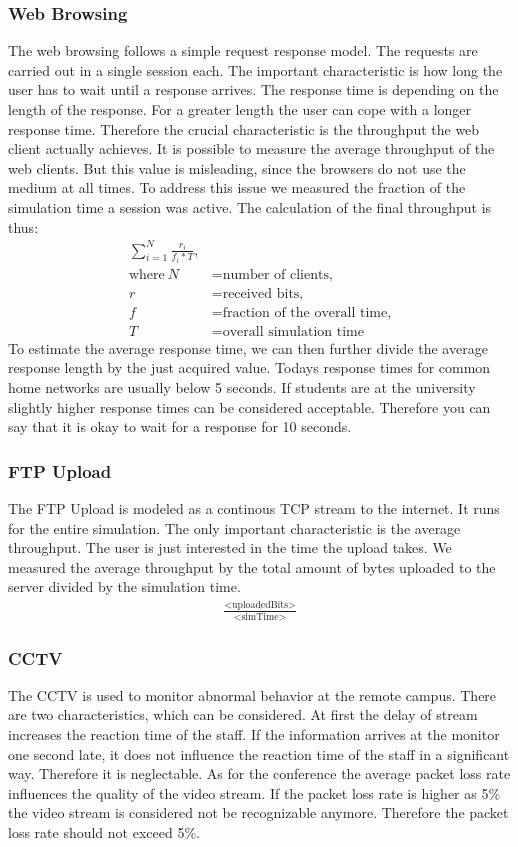 \documentclass[
10pt, %
a4paper, %
oneside, %
headinclude,footinclude, %
BCOR5mm, %
]{scrartcl}
\begin{document}
\subsubsection{Web Browsing}
The web browsing follows a simple request response model. The requests are carried out in a single session each. The important characteristic is how long the user has to wait until a response arrives. The response time is depending on the length of the response. For a greater length the user can cope with a longer response time. Therefore the crucial characteristic is the throughput the web client actually achieves. 
It is possible to measure the average throughput of the web clients. But this value is misleading, since the browsers do not use the medium at all times. To address this issue we measured the fraction of the simulation time a session was active. The calculation of the final throughput is thus:
\begin{align*}
\sum_{i=1}^{N}\frac{r_{i}}{f_{i} * T}, \\
\text{where}~N &= \text{number of clients,} \\
r &= \text{received bits,} \\
f &= \text{fraction of the overall time,} \\
T &= \text{overall simulation time}
\end{align*}
To estimate the average response time, we can then further divide the average response length by the just acquired value.
Todays response times for common home networks are usually below 5 seconds. If students are at the university slightly higher response times can be considered acceptable. Therefore you can say that it is okay to wait for a response for 10 seconds. 

\subsubsection{FTP Upload}
The FTP Upload is modeled as a continous TCP stream to the internet. It runs for the entire simulation. The only important characteristic is the average throughput. The user is just interested in the time the upload takes. We measured the average throughput by the total amount of bytes uploaded to the server divided by the simulation time.
\begin{align*}
\frac{\text{<uploadedBits>}}{\text{<simTime>}}
\end{align*}

\subsubsection{CCTV}
The CCTV is used to monitor abnormal behavior at the remote campus. There are two characteristics, which can be considered. At first the delay of stream increases the reaction time of the staff. If the information arrives at the monitor one second late, it does not influence the reaction time of the staff in a significant way. Therefore it is neglectable. 
As for the conference the average packet loss rate influences the quality of the video stream. If the packet loss rate is higher as 5\% the video stream is considered not be recognizable anymore. Therefore the packet loss rate should not exceed 5\%.
\end{document}
